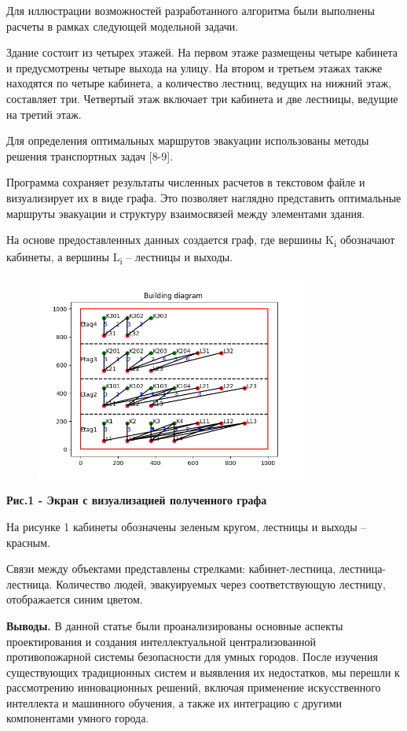 Для иллюстрации возможностей разработанного алгоритма были выполнены
расчеты в рамках следующей модельной задачи.

Здание состоит из четырех этажей. На первом этаже размещены четыре
кабинета и предусмотрены четыре выхода на улицу. На втором и третьем
этажах также находятся по четыре кабинета, а количество лестниц, ведущих
на нижний этаж, составляет три. Четвертый этаж включает три кабинета и
две лестницы, ведущие на третий этаж.

Для определения оптимальных маршрутов эвакуации использованы методы
решения транспортных задач {[}8-9{]}.

Программа сохраняет результаты численных расчетов в текстовом файле и
визуализирует их в виде графа. Это позволяет наглядно представить
оптимальные маршруты эвакуации и структуру взаимосвязей между элементами
здания.

На основе предоставленных данных создается граф, где вершины
K\textsubscript{i} обозначают кабинеты, а вершины L\textsubscript{i} --
лестницы и выходы.

\begin{figure}[H]
	\centering
	\includegraphics[width=0.8\textwidth]{media/ict2/image7}
	\caption*{}
\end{figure}


{\bfseries Рис.1 - Экран с визуализацией полученного графа}

На рисунке 1 кабинеты обозначены зеленым кругом, лестницы и выходы --
красным.

Связи между объектами представлены стрелками: кабинет-лестница,
лестница-лестница. Количество людей, эвакуируемых через соответствующую
лестницу, отображается синим цветом.

{\bfseries Выводы.} В данной статье были проанализированы основные аспекты
проектирования и создания интеллектуальной централизованной
противопожарной системы безопасности для умных городов. После изучения
существующих традиционных систем и выявления их недостатков, мы перешли
к рассмотрению инновационных решений, включая применение искусственного
интеллекта и машинного обучения, а также их интеграцию с другими
компонентами умного города.

